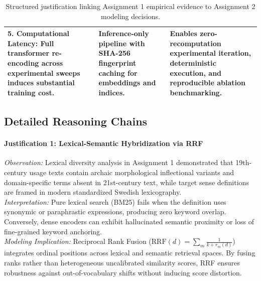 \begin{table}[H]
\begin{tabular}{p{4.2cm}p{4.6cm}p{5.8cm}}
\addlinespace
\textbf{5. Computational Latency}: Full transformer re-encoding across experimental sweeps induces substantial training cost. & Inference-only pipeline with SHA-256 fingerprint caching for embeddings and indices. & Enables zero-recomputation experimental iteration, deterministic execution, and reproducible ablation benchmarking. \\
\bottomrule
\end{tabular}
\caption{Structured justification linking Assignment 1 empirical evidence to Assignment 2 modeling decisions.}
\label{tab:justification_mapping}
\end{table}

\subsection{Detailed Reasoning Chains}

\paragraph{Justification 1: Lexical-Semantic Hybridization via RRF}
\textit{Observation:} Lexical diversity analysis in Assignment 1 demonstrated that 19th-century usage texts contain archaic morphological inflectional variants and domain-specific terms absent in 21st-century text, while target sense definitions are framed in modern standardized Swedish lexicography.\\
\textit{Interpretation:} Pure lexical search (BM25) fails when the definition uses synonymic or paraphrastic expressions, producing zero keyword overlap. Conversely, dense encoders can exhibit hallucinated semantic proximity or loss of fine-grained keyword anchoring.\\
\textit{Modeling Implication:} Reciprocal Rank Fusion ($\text{RRF}(d) = \sum_{m} \frac{1}{k + r_m(d)}$) integrates ordinal positions across lexical and semantic retrieval spaces. By fusing ranks rather than heterogeneous uncalibrated similarity scores, RRF ensures robustness against out-of-vocabulary shifts without inducing score distortion.

